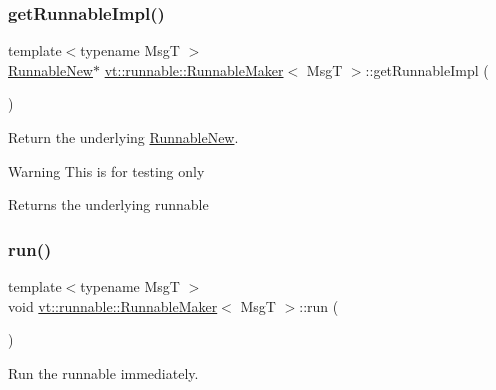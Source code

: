\subsubsection{\texorpdfstring{get\+Runnable\+Impl()}{getRunnableImpl()}}
{\footnotesize\ttfamily template$<$typename MsgT $>$ \\
\hyperlink{structvt_1_1runnable_1_1_runnable_new}{Runnable\+New}$\ast$ \hyperlink{structvt_1_1runnable_1_1_runnable_maker}{vt\+::runnable\+::\+Runnable\+Maker}$<$ MsgT $>$\+::get\+Runnable\+Impl (\begin{DoxyParamCaption}{ }\end{DoxyParamCaption})\hspace{0.3cm}{\ttfamily [inline]}}



Return the underlying {\ttfamily \hyperlink{structvt_1_1runnable_1_1_runnable_new}{Runnable\+New}}. 

\begin{DoxyWarning}{Warning}
This is for testing only
\end{DoxyWarning}
\begin{DoxyReturn}{Returns}
the underlying runnable 
\end{DoxyReturn}
\mbox{\label{structvt_1_1runnable_1_1_runnable_maker_a8fb3e1362dd6f746e991786654f5bd40}} 
\subsubsection{\texorpdfstring{run()}{run()}}
{\footnotesize\ttfamily template$<$typename MsgT $>$ \\
void \hyperlink{structvt_1_1runnable_1_1_runnable_maker}{vt\+::runnable\+::\+Runnable\+Maker}$<$ MsgT $>$\+::run (\begin{DoxyParamCaption}{ }\end{DoxyParamCaption})\hspace{0.3cm}{\ttfamily [inline]}}



Run the runnable immediately. 

\mbox{\label{structvt_1_1runnable_1_1_runnable_maker_a7f36cd1bb5c957840dfbe108fc1983f6}} 
